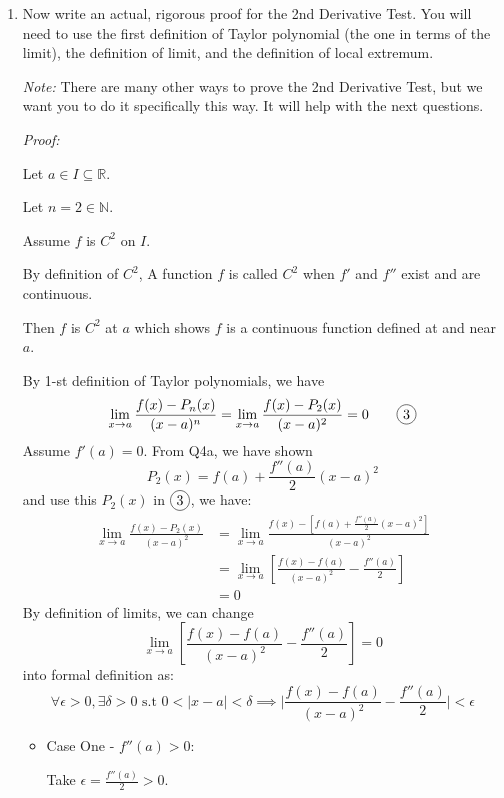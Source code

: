 \documentclass[12pt]{exam}
\newcommand{\R}{\mathbb{R}}
\newcommand{\N}{\mathbb{N}}
\newcommand*\circled[1]{\tikz[baseline=(char.base)]{
            \node[shape=circle,draw,inner sep=2pt] (char) {#1};}}
\begin{document}
\begin{enumerate}
\begin{enumerate}
			\newpage
			
		\item  \label{qu:pf} Now write an actual, rigorous proof for the 2nd Derivative Test.  You will need to use the first definition of Taylor polynomial (the one in terms of the limit), the definition of limit, and the definition of local extremum.
				
			\emph{Note:}  There are many other ways to prove the 2nd Derivative Test, but we want you to do it specifically this way. It will help with the next questions.
			
			\emph{Proof:}
			
			Let $a \in I\subseteq\R$.
			
			Let $n=2\in\N$.
			
		    Assume $f$ is $C^2$ on $I$.
		    
		    By definition of $C^2$, A function $f$ is called $C^2$ when $f'$ and $f''$ exist and are continuous.
			
			Then $f$ is $C^2$ at $a$ which shows $f$ is a continuous function defined at and near $a$.
			
			By 1-st definition of Taylor polynomials, we have
			$$
			    \lim_{x\to a}\frac{f(x)-P_n(x)}{(x-a)^n}=\lim_{x\to a}\frac{f(x)-P_2(x)}{(x-a)^2}=0\qquad\circled{3}
			$$
			Assume $f'(a) = 0$. From Q4a, we have shown
			$$
			    P_2(x)=f(a)+\frac{f''(a)}{2}(x-a)^2
			$$
			and use this $P_2(x)$ in $\circled{3}$, we have:
			\begin{align*}
			    \lim_{x\to a}\frac{f(x)-P_2(x)}{(x-a)^2}
			    &=\lim_{x\to a}\frac{f(x)-[f(a)+\frac{f''(a)}{2}(x-a)^2]}{(x-a)^2}\\
			    &=\lim_{x\to a}[\frac{f(x)-f(a)}{(x-a)^2}-\frac{f''(a)}{2}]\\
			    &=0
			\end{align*}
			By definition of limits, we can change
			$$
			    \lim_{x\to a}[\frac{f(x)-f(a)}{(x-a)^2}-\frac{f''(a)}{2}]=0
			$$
			into formal definition as:
			$$
			    \forall\epsilon>0, \exists\delta>0 \mbox{ s.t } 0<\vert{x-a}\vert<\delta\implies\vert{\frac{f(x)-f(a)}{(x-a)^2}-\frac{f''(a)}{2}}\vert<\epsilon
			$$
			\begin{itemize}
			    \item Case One - $f''(a)>0$:
			        
			        Take $\epsilon=\frac{f''(a)}{2}>0$.
			        

\end{itemize}
\end{enumerate}
\end{enumerate}
\end{document}
